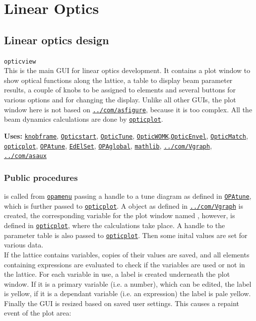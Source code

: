 \documentclass[12pt]{article}
\newcommand\code[1]{{\tt #1}}
\newcommand\guico[1]{{\color{blue}\code{#1}}}
\newcommand\guifco[1]{{\color{violet}\code{#1}}}
\newcommand{\unico}[1]{{\color{burntorange}\code{#1}}}
\newcommand{\opagui}[1]{\colorbox{blue!20}{\code{#1}}}
\newcommand{\oguih}[2]{\subsection{\label{#2}#1}{\Huge\opagui{#2}}\\}
\newcommand{\ogui}[1]{\hyperref[#1]{\opagui{#1}}}
\newcommand{\opaguif}[1]{\colorbox{violet!30}{\code{#1}}}
\newcommand{\oguif}[1]{\hyperref[#1]{\opaguif{#1}}}
\newcommand{\opauni}[1]{\colorbox{orange!30}{\code{#1}}}
\newcommand{\ouni}[1]{\hyperref[#1]{\opauni{#1}}}
\newcommand{\uses}[1]{{\bf Uses: } #1}
\newcommand{\desc}[1]{#1}
\newcommand{\ppro}[1]{\subsubsection*{Public procedures} #1}
\begin{document}
\section{\label{seclino}Linear Optics}

\oguih{Linear optics design}{opticview} 

\desc{This is the main GUI for linear optics development. It contains a plot window to show optical functions along the lattice, a table to display beam parameter results, a couple of knobs to be assigned to elements and several buttons for various options and for changing the display. Unlike all other GUIs, the plot window here is not based on \oguif{../com/asfigure}, because it is too complex. All the beam dynamics calculations are done by \ouni{opticplot}.}

\uses{\oguif{knobframe}, \ogui{Opticstart}, \ogui{OpticTune}, \ogui{OpticWOMK},\ogui{OpticEnvel}, \ogui{OpticMatch}, \ouni{opticplot}, \ogui{OPAtune}, \ogui{EdElSet}, \ouni{OPAglobal}, \ouni{mathlib}, \oguif{../com/Vgraph}, \ouni{../com/asaux}} 

\ppro{
\guico{Init} is called from \ogui{opamenu} passing a handle to a tune diagram as defined in \ogui{OPAtune}, which is further passed to \ouni{opticplot}. A \guifco{Vplot} object as defined in \oguif{../com/Vgraph} is created, the corresponding variable for the plot window named \unico{vp}, however, is defined in \ouni{opticplot}, where the calculations take place. A handle to the parameter table \guico{tab} is also passed to \ouni{opticplot}. Then some inital values are set for various data.\\
If the lattice contains variables, copies of their values are saved, and all elements containing expressions are evaluated to check if the variables are used or not in the lattice. For each variable in use, a label is created underneath the plot window. If it is a primary variable (i.e. a number), which can be edited, the label is yellow, if it is a dependant variable (i.e. an expression) the label is pale yellow.\\
Finally the GUI is resized based on saved user settings. This causes a repaint event of the plot area:
}
\end{document}
